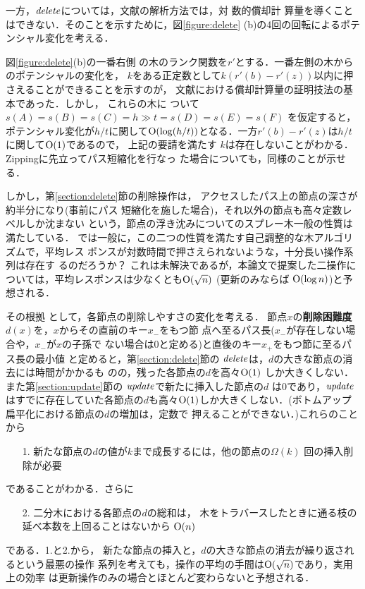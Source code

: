 \documentclass[T]{compsoft}
\begin{document}
一方，${\it delete\/}$については，文献\Cite{ST85}の解析方法では，対
数的償却計
算量を導くことはできない．そのことを示すために，図\ref{figure:delete}
(b)の4回の回転によるポテンシャル変化を考える．

図\ref{figure:delete}(b)の一番右側
の木のランク関数を$r'$とする．一番左側の木からのポテンシャルの変化を，
$k$をある正定数として$k(r'(b)-r'(z))$以内に押さえることができることを示すのが，
文献\Cite{ST85}における償却計算量の証明技法の基本であった．しかし，
これらの木に
ついて$s(A)= s(B) = s(C) = h\gg t = s(D) = s(E) = s(F)$
を仮定すると，ポテンシャル変化が$h/t$に関して${\rm O}(\log
(h/t))$となる．一方$r'(b)-r'(z)$は$h/t$に関して${\rm O}(1)$であるので，
上記の要請を満たす
$k$は存在しないことがわかる．Zippingに先立ってパス短縮化を行なっ
た場合についても，同様のことが示せる．

しかし，第\ref{section:delete}節の削除操作は，
%
アクセスしたパス上の節点の深さが約半分になり(事前にパス
短縮化を施した場合)，それ以外の節点も高々定数レベルしか沈まない
%
という，節点の浮き沈みについてのスプレー木一般の性質は満たしている．
%
では一般に，この二つの性質を満たす自己調整的な木アルゴリズムで，平均レス
ポンスが対数時間で押さえられないような，十分長い操作系列は存在す
るのだろうか？ これは未解決であるが，本論文で提案した二操作に
ついては，平均レスポンスは少なくとも${\rm O}(\sqrt n)$ (更新のみならば
${\rm O}(\log n)$)と予想される．

その根拠
として，各節点の削除しやすさの変化を考える．
節点$x$の{\bf 削除困難度}$d(x)$を，$x$からその直前のキー$x_-$をもつ節
点へ至るパス長($x_-$が存在しない場合や，$x_-$が$x$の子孫で
ない場合は$0$と定める)と直後のキー$x_+$をもつ節に至るパス長の最小値
と定めると，第\ref{section:delete}節の
${\it delete\/}$は，$d$の大きな節点の消去には時間がかかるも
のの，残った各節点の$d$を高々${\rm O}(1)$
しか大きくしない．また第\ref{section:update}節の
${\it update\/}$で新たに挿入した節点の$d$
は$0$であり，${\it update\/}$はすでに存在していた各節点の$d$も高々${\rm
O}(1)$しか大きくしない．(ボトムアップ扁平化における節点の$d$の増加は，定数で
押えることができない．)これらのことから
%
\begin{enumerate}
\item[1.]
新たな節点の$d$の値が$k$まで成長するには，他の節点の$\Omega(k)$
回の挿入削除が必要
\end{enumerate}
%
であることがわかる．さらに
%
\begin{enumerate}
\item[2.]
二分木における各節点の$d$の総和は，
木をトラバースしたときに通る枝の延べ本数を上回ることはないから
${\rm O}(n)$
\end{enumerate}
%
である．1.と2.から，
新たな節点の挿入と，$d$の大きな節点の消去が繰り返されるという最悪の操作
系列を考えても，操作の平均の手間は${\rm O}(\sqrt n)$であり，実用上の効率
は更新操作のみの場合とほとんど変わらないと予想される．
\end{document}

